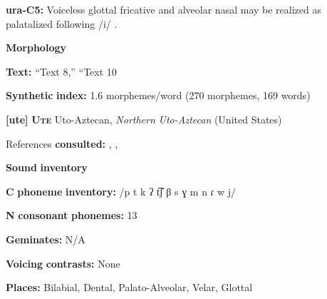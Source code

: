 \begin{styleBody}
\textbf{ura-C5:} Voiceless glottal fricative and alveolar nasal may be realized as palatalized following /i/ \citep[47]{Olawsky2006}.
\end{styleBody}

\begin{styleBody}
\textbf{Morphology}
\end{styleBody}

\begin{styleBody}
\textbf{Text:} “Text 8,” “Text 10 \citep[902-905]{Olawsky2006}
\end{styleBody}

\begin{styleBody}
\textbf{Synthetic} \textbf{index:} 1.6 morphemes/word (270 morphemes, 169 words)
\end{styleBody}

\begin{styleBody}
\textbf{[ute]}   \textbf{\textsc{Ute}  }  Uto-Aztecan, \textit{Northern} \textit{Uto-Aztecan} (United States)
\end{styleBody}

\begin{styleBody}
References \textbf{consulted:} \citet{Givón2011}, \citet{Harms1966}, \citet{Oberly2013}
\end{styleBody}

\begin{styleBody}
\textbf{Sound} \textbf{inventory}
\end{styleBody}

\begin{styleBody}
\textbf{C} \textbf{phoneme} \textbf{inventory:} /p t k ʔ t͡ʃ β s ɣ m n ɾ w j/
\end{styleBody}

\begin{styleBody}
\textbf{N} \textbf{consonant} \textbf{phonemes:} 13
\end{styleBody}

\begin{styleBody}
\textbf{Geminates:} N/A
\end{styleBody}

\begin{styleBody}
\textbf{Voicing} \textbf{contrasts:} None
\end{styleBody}

\begin{styleBody}
\textbf{Places:} Bilabial, Dental, Palato-Alveolar, Velar, Glottal
\end{styleBody}

